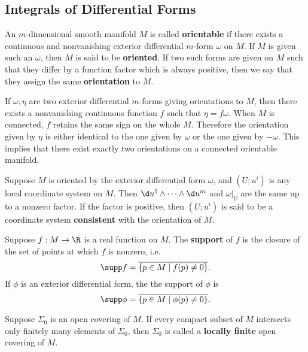 \documentclass[11pt]{article}
\begin{document}
\subsection{Integrals of Differential Forms}

\begin{definition}
    An $m$-dimensional smooth manifold $M$ is called \textbf{orientable} if there exists a continuous and nonvanishing exterior differential $m$-form $\omega$ on $M$. If $M$ is given such an $\omega$, then $M$ is said to be \textbf{oriented}. If two such forms are given on $M$ such that they differ by a function factor which is always positive, then we say that they assign the same \textbf{orientation} to $M$. 
\end{definition}

If $\omega, \eta$ are two exterior differential $m$-forms giving orientations to $M$, then there exists a nonvanishing continuous function $f$ such that $\eta = f\omega$. When $M$ is connected, $f$ retains the same sign on the whole $M$. Therefore the orientation given by $\eta$ is either identical to the one given by $\omega$ or the one given by $-\omega$. This implies that there exist exactly two orientations on a connected orientable manifold. 

Suppose $M$ is oriented by the exterior differential form $\omega$, and $(U;u^i)$ is any local coordinate system on $M$. Then $\d u^1 \wedge \cdots \wedge \d u^m$ and $\omega|_U$ are the same up to a nonzero factor. If the factor is positive, then $(U;u^i)$ is said to be a coordinate system \textbf{consistent} with the orientation of $M$. 

\begin{definition}
    Suppose $f : M \rightarrow \R$ is a real function on $M$. The \textbf{support} of $f$ is the closure of the set of points at which $f$ is nonzero, i.e. $$\supp f = \overline{\{p \in M \mid f(p) \neq 0\}}.$$ If $\phi$ is an exterior differential form, the the support of $\phi$ is $$\supp\phi = \overline{\{p \in M \mid \phi(p) \neq 0\}}.$$
\end{definition}

\begin{definition}
    Suppose $\Sigma_0$ is an open covering of $M$. If every compact subset of $M$ intersects only finitely many elements of $\Sigma_0$, then $\Sigma_0$ is called a \textbf{locally finite} open covering of $M$. 
\end{definition}
\end{document}
